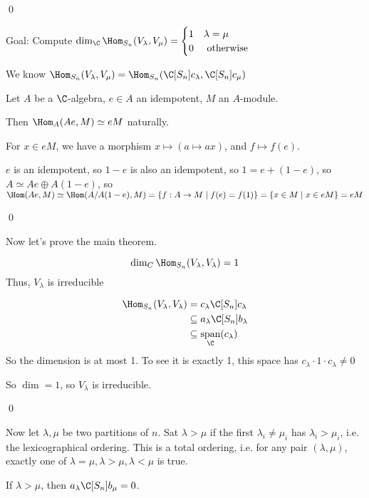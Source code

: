 \documentclass[x11names,reqno,14pt]{extarticle}
\DeclareMathOperator{\Span}{span}
\begin{document}
\qed

Goal: Compute $\dim_\C\Hom_{S_n}(V_\lambda, V_\mu) = \begin{cases} 1 & \lambda = \mu \\ 0 & \text{ otherwise } \\ \end{cases}$

We know $\Hom_{S_n}(V_\lambda,V_\mu)  = \Hom_{S_n}(\C[S_n]c_\lambda, \C[S_n]c_\mu)$

\prop

Let $A$ be a $\C$-algebra, $e \in A$ an idempotent, $M$ an $A$-module.

Then $\Hom_A(Ae,M) \simeq eM$ naturally. 

\proof

For $x \in eM$, we have a morphism $x \mapsto (a \mapsto ax)$, and $f \mapsto f(e)$. 

$e$ is an idempotent, so $1 - e$ is also an idempotent, so $1 = e + (1 - e)$, so $A \simeq Ae\oplus A(1-e)$, so $\Hom(Ae, M) \simeq \Hom(A/A(1-e),M)= \{f:A \to M \mid f(e) = f(1)\}=\{x\in M \mid x \in eM\} = eM$

\qed

Now let's prove the main theorem. 

\prop

\[
\dim_C\Hom_{S_n}(V_\lambda,V_\lambda) = 1
\]
Thus, $V_\lambda$ is irreducible

\proof

\begin{align*}
\Hom_{S_n}(V_\lambda,V_\lambda)&=c_\lambda \C[S_n]c_\lambda \\
& \subseteq a_\lambda \C[S_n]b_\lambda \\
& \subseteq \Span_{\C}(c_\lambda) \\
\end{align*}
So the dimension is at most 1. To see it is exactly 1, this space has $c_\lambda\cdot1\cdot c_\lambda \neq 0$

So $\dim = 1$, so $V_\lambda$ is irreducible.

\qed

Now let $\lambda,\mu$ be two partitions of $n$. Sat $\lambda > \mu$ if the first $\lambda_i \neq \mu_i$ has $\lambda_i > \mu_i$, i.e. the lexicographical ordering. This is a total ordering, i.e. for any pair $(\lambda,\mu)$, exactly one of $\lambda = \mu, \lambda > \mu, \lambda < \mu$ is true.

\prop

If $\lambda > \mu$, then $a_\lambda \C[S_n]b_\mu = 0$. 
\end{document}

